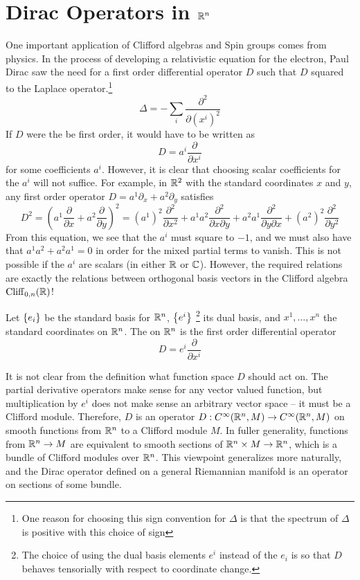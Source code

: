 %
\section{Dirac Operators in $\mathbb{R}^n$}
%
One important application of Clifford algebras and Spin groups comes from
physics. In the process of developing a relativistic equation for the electron,
Paul Dirac saw the need for a first order differential operator $D$ such
that $D$ squared to the Laplace operator.\footnote{One reason for choosing this sign
 convention for $\Delta$ is that the spectrum of $\Delta$
is positive with this choice of sign}
\[
 \Delta = -\sum_i \frac{\partial^2}{\partial(x^i)^2}
\]
If $D$ were the be first order, it would have to be written as
\[
 D = a^i \frac{\partial}{\partial x^i}
\]
for some coefficients $a^i$. However, it is clear that choosing scalar coefficients
for the $a^i$ will not suffice. For example, in $\mathbb{R}^2$ with the standard coordinates
$x$ and $y$, any first order operator $D = a^1\partial_x + a^2\partial_y$ satisfies
\[
 D^2 = \left(a^1\frac{\partial}{\partial x} + a^2\frac{\partial}{\partial y}\right)^2
 = (a^1)^2\frac{\partial^2}{\partial x^2} + a^1a^2\frac{\partial^2}{\partial x \partial y}
 + a^2a^1 \frac{\partial^2}{\partial y \partial x} + (a^2)^2 \frac{\partial^2}{\partial y^2}
\]
From this equation, we see that the $a^i$ must square to $-1$, and we must also
have that $a^1a^2 + a^2a^1 = 0$ in order for the mixed partial terms to vanish.
This is not possible if the $a^i$ are scalars (in either $\mathbb{R}$ or $\mathbb{C}$).
However, the required relations are exactly the relations between orthogonal
basis vectors in the Clifford algebra $\operatorname{Cliff}_{0,n}(\mathbb{R})$!
%
\begin{defn}
 Let $\left\lbrace e_i \right\rbrace$ be the standard basis for $\mathbb{R}^n$, $\left\lbrace e^i \right\rbrace$
 \footnote{The choice of using the dual basis elements $e^i$ instead of the
 $e_i$ is so that $D$ behaves tensorially with respect to coordinate change.}
 its dual basis, and $x^1, \ldots ,x^n$ the standard coordinates on $\mathbb{R}^n$.
 The  on $\mathbb{R}^n$ is the first order differential operator
 \[
  D = e^i\frac{\partial}{\partial x^i}
 \]
\end{defn}
%
It is not clear from the definition what function space $D$ should act on.
The partial derivative operators make sense for any vector valued function, but
multiplication by $e^i$ does not make sense an arbitrary vector space -- it must
be a Clifford module. Therefore, $D$ is an operator
$D: C^\infty(\mathbb{R}^n, M) \to C^\infty(\mathbb{R}^n, M)$ on smooth functions from $\mathbb{R}^n$
to a Clifford module $M$. In fuller generality, functions from $\mathbb{R}^n \to M$
are equivalent to smooth sections of $\mathbb{R}^n \times M \to \mathbb{R}^n$, which is a bundle
of Clifford modules over $\mathbb{R}^n$. This viewpoint generalizes more naturally,
and the Dirac operator defined on a general Riemannian manifold is an operator
on sections of some bundle. \\

